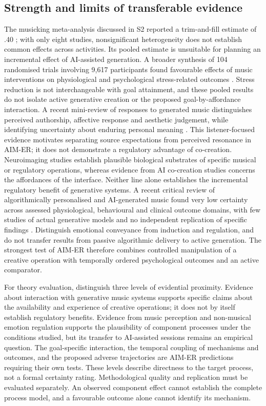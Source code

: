\documentclass[11pt,a4paper]{article}
\begin{document}
\subsection{Strength and limits of transferable evidence}
The musicking meta-analysis discussed in S2 reported a trim-and-fill estimate of .40 \citep{peters2024}; with only eight studies, nonsignificant heterogeneity does not establish common effects across activities. Its pooled estimate is unsuitable for planning an incremental effect of AI-assisted generation. A broader synthesis of 104 randomised trials involving 9,617 participants found favourable effects of music interventions on physiological and psychological stress-related outcomes \citep{dewitte2020}. Stress reduction is not interchangeable with goal attainment, and these pooled results do not isolate active generative creation or the proposed goal-by-affordance interaction. A recent mini-review of responses to generated music distinguishes perceived authorship, affective response and aesthetic judgement, while identifying uncertainty about enduring personal meaning \citep{hesun2026}. This listener-focused evidence motivates separating source expectations from perceived resonance in AIM-ER; it does not demonstrate a regulatory advantage of co-creation. Neuroimaging studies establish plausible biological substrates of specific musical or regulatory operations, whereas evidence from AI co-creation studies concerns the affordances of the interface. Neither line alone establishes the incremental regulatory benefit of generative systems. A recent critical review of algorithmically personalised and AI-generated music found very low certainty across assessed physiological, behavioural and clinical outcome domains, with few studies of actual generative models and no independent replication of specific findings \citep{jin2026}. Distinguish emotional conveyance from induction and regulation, and do not transfer results from passive algorithmic delivery to active generation. The strongest test of AIM-ER therefore combines controlled manipulation of a creative operation with temporally ordered psychological outcomes and an active comparator.

For theory evaluation, distinguish three levels of evidential proximity. Evidence about interaction with generative music systems supports specific claims about the availability and experience of creative operations; it does not by itself establish regulatory benefits. Evidence from music perception and non-musical emotion regulation supports the plausibility of component processes under the conditions studied, but its transfer to AI-assisted sessions remains an empirical question. The goal-specific interaction, the temporal coupling of mechanisms and outcomes, and the proposed adverse trajectories are AIM-ER predictions requiring their own tests. These levels describe directness to the target process, not a formal certainty rating. Methodological quality and replication must be evaluated separately. An observed component effect cannot establish the complete process model, and a favourable outcome alone cannot identify its mechanism.
\end{document}
